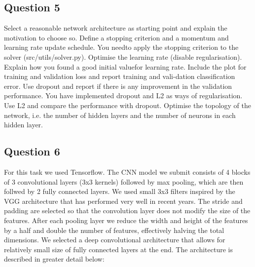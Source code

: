 \documentclass[12pt,twoside]{article}
\begin{document}
\subsection{Question 5}
Select a reasonable network architecture as starting point and explain the motivation to choose so. 
Define a stopping criterion and a momentum and learning rate update schedule. 
You needto apply the stopping criterion to the solver (src/utils/solver.py).
Optimise the learning rate (disable regularisation). 
Explain how you found a good initial valuefor learning rate. 
Include the plot for training and validation loss and report training and vali-dation classification error.
Use dropout and report if there is any improvement in the validation performance.
You have implemented dropout and L2 as ways of regularisation. 
Use L2 and compare the performance with dropout.
Optimise the topology of the network, i.e. the number of hidden layers and the number of neurons in each hidden layer.

\subsection{Question 6}
For this task we used Tensorflow. The CNN model we submit consists of 4 blocks of 3 convolutional layers (3x3 kernels) followed by max pooling, which are then follwed by 2 fully connected layers. We used small 3x3 filters inspired by the VGG architecture that has performed very well in recent years. The stride and padding are selected so that the convolution layer does not modify the size of the features. After each pooling layer we reduce the width and height of the features by a half and double the number of features, effectively halving the total dimensions. We selected a deep convolutional architecture that allows for relatively small size of fully connected layers at the end. The architecture is described in greater detail below:  
\end{document}
